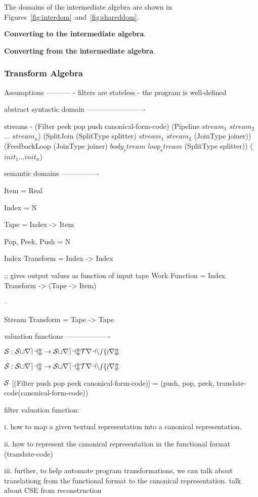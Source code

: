 The domains of the intermediate algebra are shown in
Figures~\ref{fig:interdom}~and~\ref{fig:shareddom}.  

{\bf Converting to the intermediate algebra}.

{\bf Converting from the intermediate algebra}.

\subsubsection{Transform Algebra}

Assumptions
-----------
- filters are stateless
- the program is well-defined

abstract syntactic domain
-------------------------

streams - 
  (Filter peek pop push canonical-form-code)
  (Pipeline $stream_1$ $stream_2$ ... $stream_n$)
  (SplitJoin (SplitType splitter) $stream_1$ $stream_2$ (JoinType joiner))
  (FeedbackLoop (JoinType joiner) $body_stream$ $loop_stream$
        (SplitType splitter))
($init_1 \dots init_n$)

semantic domains
----------------

Item = Real

Index = N

Tape = Index -> Item

Pop, Peek, Push = N

Index Transform = Index -> Index

;; gives output values as function of input tape
Work Function = Index Transform -> (Tape -> Item)

--

Stream Transform = Tape -> Tape

valuation functions
-------------------

$\cal{S}: Stream \ra Stream Transform$

$\cal{S}: Stream \ra Stream Transform$

$\cal{S}$ [(Filter push pop peek canonical-form-code)]
 = (push, pop, peek, translate-code(canonical-form-code))

filter valuation function:

i. how to map a given textual representation into a canonical
representation.

ii. how to represent the canonical representation in the functional
format (translate-code)

iii. further, to help automate program transformations, we can talk
about translationg from the functional format to the canonical
representation.  talk about CSE from reconstruction

